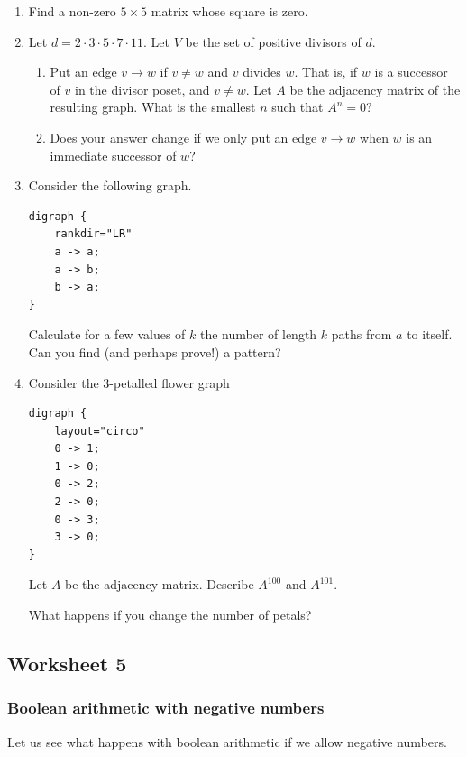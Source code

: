 \documentclass{amsart}
\begin{document}
\begin{enumerate}
\item Find a non-zero \(5 \times 5\) matrix whose square is zero.

\item Let \(d = 2 \cdot 3 \cdot 5 \cdot 7 \cdot 11\).
Let \(V\) be the set of positive divisors of \(d\).
\begin{enumerate}
\item Put an edge \(v \to w\) if \(v \neq w\) and \(v\) divides \(w\).
That is, if \(w\) is a successor of \(v\) in the divisor poset, and \(v \neq w\).
Let \(A\) be the adjacency matrix of the resulting graph.
What is the smallest \(n\) such that \(A^n = 0\)?

\item Does your answer change if we only put an edge \(v \to w\) when \(w\) is an immediate successor of \(w\)?
\end{enumerate}

\item Consider the following graph.
\begin{verbatim}
digraph {
    rankdir="LR"
    a -> a;
    a -> b;
    b -> a;
}
\end{verbatim}
\begin{center}

\label{orgff9c32a}
\end{center}
Calculate for a few values of \(k\) the number of length \(k\) paths from \(a\) to itself. Can you find (and perhaps prove!) a pattern?

\item Consider the 3-petalled flower graph
\begin{verbatim}
digraph {
    layout="circo"
    0 -> 1;
    1 -> 0;
    0 -> 2;
    2 -> 0;
    0 -> 3;
    3 -> 0;
}
\end{verbatim}
\begin{center}

\label{orgb518dd1}
\end{center}
Let \(A\) be the adjacency matrix.
Describe \(A^{100}\) and \(A^{101}\).

What happens if you change the number of petals?
\end{enumerate}
\subsection{Worksheet 5}
\label{sec:orged9e817}
\togglefalse{solutions}
\subsubsection{Boolean arithmetic with negative numbers}
\label{sec:org4229a40}
Let us see what happens with boolean arithmetic if we allow negative numbers.
\end{document}

